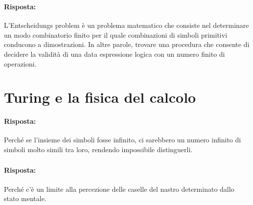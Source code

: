 \subsubsection{}


\paragraph{Risposta:} L'Entscheidungs problem è un problema matematico che consiste nel determinare
un modo combinatorio finito per il quale combinazioni di simboli primitivi conducono a dimostrazioni.
In altre parole, trovare una procedura che consente di decidere la validità di una data
espressione logica con un numero finito di operazioni.

\section{Turing e la fisica del calcolo}


\paragraph{Risposta:} Perché se l'insieme dei simboli fosse infinito, ci sarebbero un numero infinito di 
simboli molto simili tra loro, rendendo impossibile distinguerli.

\subsubsection{}


\paragraph{Risposta:} Perché c'è un limite alla percezione delle caselle del nastro determinato dallo stato mentale.

\subsubsection{}

